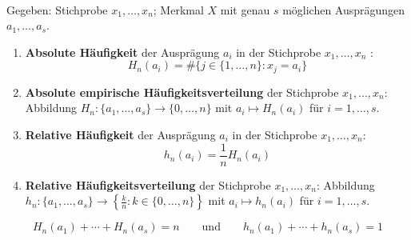 \begin{defi}
     \\
    Gegeben: Stichprobe $x_1,\dots,x_n$; \gls{Merkmal} $X$ mit genau $s$ möglichen Ausprägungen $a_1,\dots,a_s$.
    \begin{enumerate}[label=(\alph*)]
        \item \textbf{Absolute Häufigkeit}  der Ausprägung $a_i$ in der Stichprobe $x_1,\dots,x_n$
        :
        \[
            H_n(a_i) = \#\{j\in\{1,\dots,n\} : x_j = a_i\}
        \]
        \item \textbf{Absolute empirische \gls{Häufigkeitsverteilung}} der Stichprobe $x_1,\dots,x_n$:
        Abbildung $H_n : \{a_1,\dots,a_s\}\to\{0,\dots,n\}$ mit $a_i\mapsto H_n(a_i)$ für $i=1,\dots,s$. \\
        \item \textbf{Relative Häufigkeit}  der Ausprägung $a_i$ in der Stichprobe $x_1,\dots,x_n$:
        \[
            h_n(a_i) = \frac{1}{n} H_n(a_i)
        \]
        \item \textbf{Relative \gls{Häufigkeitsverteilung}} der Stichprobe $x_1,\dots,x_n$:
        Abbildung $h_n : \{a_1,\dots,a_s\}\to\left\{\frac{k}{n} : k\in\{0,\dots,n\}\right\}$ mit $a_i\mapsto h_n(a_i)$ für $i=1,\dots,s$.
    \end{enumerate}
\end{defi}

\begin{bem}
    \[
        H_n(a_1)+\cdots+H_n(a_s) = n \qquad\text{und}\qquad h_n(a_1)+\cdots+h_n(a_s)=1
    \]
\end{bem}

